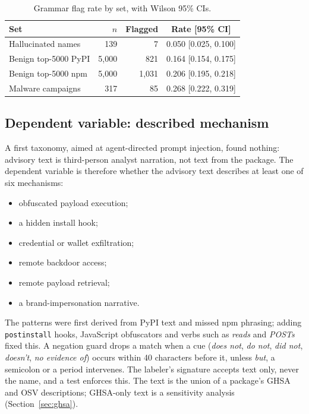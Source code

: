 \documentclass[10pt,conference]{IEEEtran}
\begin{document}
\begin{table}[t]
\centering
\caption{Grammar flag rate by set, with Wilson 95\% CIs.}
\label{tab:grammar}
\begin{tabular}{lrrc}
\toprule
Set & $n$ & Flagged & Rate [95\% CI] \\
\midrule
Hallucinated names~\cite{churilov2026} & 139 & 7 & 0.050 [0.025, 0.100] \\
Benign top-5000 PyPI & 5,000 & 821 & 0.164 [0.154, 0.175] \\
Benign top-5000 npm & 5,000 & 1,031 & 0.206 [0.195, 0.218] \\
Malware campaigns & 317 & 85 & 0.268 [0.222, 0.319] \\
\bottomrule
\end{tabular}
\end{table}

\subsection{Dependent variable: described mechanism}
\label{sec:dv}
A first taxonomy, aimed at agent-directed prompt injection, found nothing:
advisory text is third-person analyst narration, not text from the package.
The dependent variable is therefore whether the advisory text describes at
least one of six mechanisms:
\begin{itemize}
\item obfuscated payload execution;
\item a hidden install hook;
\item credential or wallet exfiltration;
\item remote backdoor access;
\item remote payload retrieval;
\item a brand-impersonation narrative.
\end{itemize}
The patterns were first derived from PyPI text and missed npm phrasing;
adding \texttt{postinstall} hooks, JavaScript obfuscators and verbs such as
\emph{reads} and \emph{POSTs} fixed this. A negation guard drops a match
when a cue (\emph{does not}, \emph{do not}, \emph{did not},
\emph{doesn't}, \emph{no evidence of}) occurs within 40 characters before
it, unless \emph{but}, a semicolon or a period intervenes. The labeler's
signature accepts text only, never the name, and a test enforces this. The
text is the union of a package's GHSA and OSV descriptions; GHSA-only text
is a sensitivity analysis (Section~\ref{sec:ghsa}).
\end{document}
